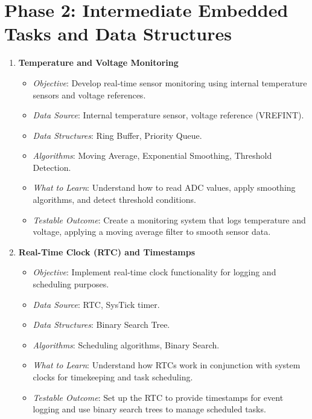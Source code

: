 \documentclass{article}
\begin{document}
\section{Phase 2: Intermediate Embedded Tasks and Data Structures}
\begin{enumerate}[label=\arabic*.]
    \item \textbf{Temperature and Voltage Monitoring}
    \begin{itemize}
        \item \textit{Objective}: Develop real-time sensor monitoring using internal temperature sensors and voltage references.
        \item \textit{Data Source}: Internal temperature sensor, voltage reference (VREFINT).
        \item \textit{Data Structures}: Ring Buffer, Priority Queue.
        \item \textit{Algorithms}: Moving Average, Exponential Smoothing, Threshold Detection.
        \item \textit{What to Learn}: Understand how to read ADC values, apply smoothing algorithms, and detect threshold conditions.
        \item \textit{Testable Outcome}: Create a monitoring system that logs temperature and voltage, applying a moving average filter to smooth sensor data.
    \end{itemize}

    \item \textbf{Real-Time Clock (RTC) and Timestamps}
    \begin{itemize}
        \item \textit{Objective}: Implement real-time clock functionality for logging and scheduling purposes.
        \item \textit{Data Source}: RTC, SysTick timer.
        \item \textit{Data Structures}: Binary Search Tree.
        \item \textit{Algorithms}: Scheduling algorithms, Binary Search.
        \item \textit{What to Learn}: Understand how RTCs work in conjunction with system clocks for timekeeping and task scheduling.
        \item \textit{Testable Outcome}: Set up the RTC to provide timestamps for event logging and use binary search trees to manage scheduled tasks.
    \end{itemize}


\end{enumerate}
\end{document}
